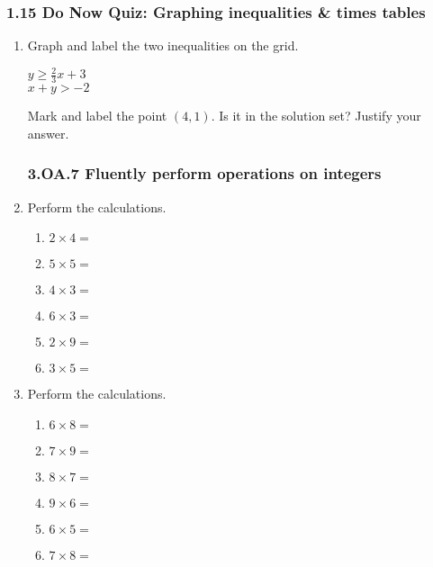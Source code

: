 \documentclass[12pt, twoside]{article}
\begin{document}
\subsubsection*{1.15 Do Now Quiz: Graphing inequalities \& times tables}
\begin{enumerate}
\item Graph and label the two inequalities on the grid. 

  \begin{multicols}{2}
    $\displaystyle y \geq \frac{2}{3}x + 3$ \\
    $x+ y > -2$
    \end{multicols} \vspace{1cm}

  \begin{center}
  \end{center}

Mark and label the point $(4,1)$. Is it in the solution set? Justify your answer.

\newpage
\subsubsection*{3.OA.7 Fluently perform operations on integers}

\item Perform the calculations.
  \begin{multicols}{2}
    \begin{enumerate}[itemsep=1cm]
      \item $2 \times 4 =$
      \item $5 \times 5 =$
      \item $4 \times 3 =$
      \item $6 \times 3 =$
      \item $2 \times 9 =$
      \item $3 \times 5 =$
    \end{enumerate}
    \end{multicols} \vspace{0.25cm}

    \item Perform the calculations.
    \begin{multicols}{2}
    \begin{enumerate}[itemsep=1cm]
      \item $6 \times 8 =$
      \item $7 \times 9 =$
      \item $8 \times 7 =$
      \item $9 \times 6 =$
      \item $6 \times 5 =$
      \item $7 \times 8 =$
    \end{enumerate}
    \end{multicols} \vspace{0.25cm}


\end{enumerate}
\end{document}
